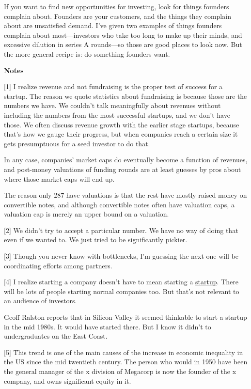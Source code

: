 If you want to find new opportunities for investing, look for things
founders complain about. Founders are your customers, and the things
they complain about are unsatisfied demand. I've given two examples of
things founders complain about most---investors who take too long to
make up their minds, and excessive dilution in series A rounds---so
those are good places to look now. But the more general recipe is: do
something founders want.

\textbf{Notes}

{[}1{]} I realize revenue and not fundraising is the proper test of
success for a startup. The reason we quote statistics about fundraising
is because those are the numbers we have. We couldn't talk meaningfully
about revenues without including the numbers from the most successful
startups, and we don't have those. We often discuss revenue growth with
the earlier stage startups, because that's how we gauge their progress,
but when companies reach a certain size it gets presumptuous for a seed
investor to do that.

In any case, companies' market caps do eventually become a function of
revenues, and post-money valuations of funding rounds are at least
guesses by pros about where those market caps will end up.

The reason only 287 have valuations is that the rest have mostly raised
money on convertible notes, and although convertible notes often have
valuation caps, a valuation cap is merely an upper bound on a valuation.

{[}2{]} We didn't try to accept a particular number. We have no way of
doing that even if we wanted to. We just tried to be significantly
pickier.

{[}3{]} Though you never know with bottlenecks, I'm guessing the next
one will be coordinating efforts among partners.

{[}4{]} I realize starting a company doesn't have to mean starting a
\href{growth.html}{startup}. There will be lots of people starting
normal companies too. But that's not relevant to an audience of
investors.

Geoff Ralston reports that in Silicon Valley it seemed thinkable to
start a startup in the mid 1980s. It would have started there. But I
know it didn't to undergraduates on the East Coast.

{[}5{]} This trend is one of the main causes of the increase in economic
inequality in the US since the mid twentieth century. The person who
would in 1950 have been the general manager of the x division of
Megacorp is now the founder of the x company, and owns significant
equity in it.

